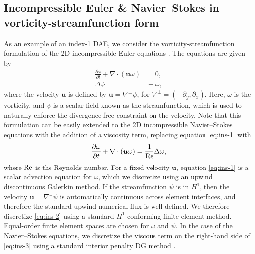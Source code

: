 \documentclass[review]{siamart}
\begin{document}
\subsection{Incompressible Euler \& Navier--Stokes in vorticity-streamfunction form}
\label{sec:numerics:khi}

As an example of an index-1 DAE, we consider the vorticity-streamfunction formulation of the 2D incompressible Euler equations \cite{Liu2000}.
The equations are given by
\begin{align}
	\label{eq:ins-1}
	\frac{\partial\omega}{\partial t} + \nabla\cdot(\bm{u} \omega) &= 0, \\
	\label{eq:ins-2}
	\Delta \psi &= \omega,
\end{align}
where the velocity $\bm u$ is defined by $\bm u = \nabla^\perp \psi$, for $\nabla^\perp = (-\partial_y, \partial_x)$.
Here, $\omega$ is the vorticity, and $\psi$ is a scalar field known as the streamfunction, which is used to naturally enforce the divergence-free constraint on the velocity.
Note that this formulation can be easily extended to the 2D incompressible Navier--Stokes equations with the addition of a viscosity term, replacing equation \eqref{eq:ins-1} with
\begin{equation} \label{eq:ins-3}
	\frac{\partial\omega}{\partial t} + \nabla\cdot(\bm{u} \omega) = \frac{1}{\rm Re} \Delta \omega,
\end{equation}
where $\rm Re$ is the Reynolds number.
For a fixed velocity $\bm u$, equation \eqref{eq:ins-1} is a scalar advection equation for $\omega$, which we discretize using an upwind discontinuous Galerkin method.
If the streamfunction $\psi$ is in $H^1$, then the velocity $\bm u = \nabla^\perp \psi$ is automatically continuous across element interfaces, and therefore the standard upwind numerical flux is well-defined.
We therefore discretize \eqref{eq:ins-2} using a standard $H^1$-conforming finite element method.
Equal-order finite element spaces are chosen for $\omega$ and $\psi$.
In the case of the Navier--Stokes equations, we discretize the viscous term on the right-hand side of \eqref{eq:ins-3} using a standard interior penalty DG method \cite{Arnold1982}.
\end{document}
